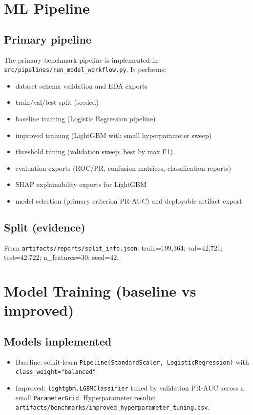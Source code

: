 \documentclass[11pt]{article}
\newcommand{\code}[1]{\texttt{#1}}
\begin{document}
\section{ML Pipeline}
\subsection{Primary pipeline}
The primary benchmark pipeline is implemented in \code{src/pipelines/run_model_workflow.py}. It performs:
\begin{itemize}
  \item dataset schema validation and EDA exports
  \item train/val/test split (seeded)
  \item baseline training (Logistic Regression pipeline)
  \item improved training (LightGBM with small hyperparameter sweep)
  \item threshold tuning (validation sweep; best by max F1)
  \item evaluation exports (ROC/PR, confusion matrices, classification reports)
  \item SHAP explainability exports for LightGBM
  \item model selection (primary criterion PR-AUC) and deployable artifact export
\end{itemize}

\subsection{Split (evidence)}
From \code{artifacts/reports/split_info.json}:
train=199,364; val=42,721; test=42,722; n\_features=30; seed=42.

\section{Model Training (baseline vs improved)}
\subsection{Models implemented}
\begin{itemize}
  \item Baseline: scikit-learn \code{Pipeline(StandardScaler, LogisticRegression)} with \code{class_weight="balanced"}.
  \item Improved: \code{lightgbm.LGBMClassifier} tuned by validation PR-AUC across a small \code{ParameterGrid}. Hyperparameter results: \code{artifacts/benchmarks/improved_hyperparameter_tuning.csv}.
\end{itemize}
\end{document}
